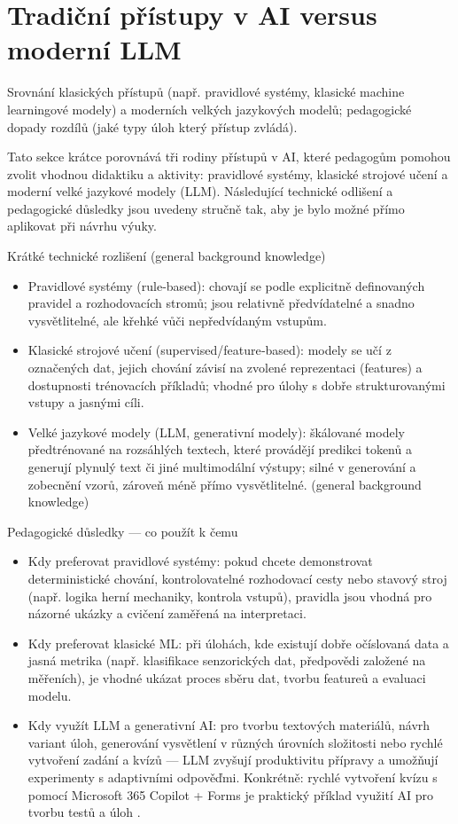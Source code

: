 \documentclass{report}%
\begin{document}
%
\section{Tradiční přístupy v AI versus moderní LLM}%
Srovnání klasických přístupů (např. pravidlové systémy, klasické machine learningové modely) a moderních velkých jazykových modelů; pedagogické dopady rozdílů (jaké typy úloh který přístup zvládá).%


%
Tato sekce krátce porovnává tři rodiny přístupů v AI, které pedagogům pomohou zvolit vhodnou didaktiku a aktivity: pravidlové systémy, klasické strojové učení a moderní velké jazykové modely (LLM). Následující technické odlišení a pedagogické důsledky jsou uvedeny stručně tak, aby je bylo možné přímo aplikovat při návrhu výuky.

Krátké technické rozlišení (general background knowledge)
\begin{itemize}
  \item Pravidlové systémy (rule‑based): chovají se podle explicitně definovaných pravidel a rozhodovacích stromů; jsou relativně předvídatelné a snadno vysvětlitelné, ale křehké vůči nepředvídaným vstupům.
  \item Klasické strojové učení (supervised/feature‑based): modely se učí z označených dat, jejich chování závisí na zvolené reprezentaci (features) a dostupnosti trénovacích příkladů; vhodné pro úlohy s dobře strukturovanými vstupy a jasnými cíli.
  \item Velké jazykové modely (LLM, generativní modely): škálované modely předtrénované na rozsáhlých textech, které provádějí predikci tokenů a generují plynulý text či jiné multimodální výstupy; silné v generování a zobecnění vzorů, zároveň méně přímo vysvětlitelné. (general background knowledge)
\end{itemize}

Pedagogické důsledky — co použít k čemu
\begin{itemize}
  \item Kdy preferovat pravidlové systémy: pokud chcete demonstrovat deterministické chování, kontrolovatelné rozhodovací cesty nebo stavový stroj (např. logika herní mechaniky, kontrola vstupů), pravidla jsou vhodná pro názorné ukázky a cvičení zaměřená na interpretaci.
  \item Kdy preferovat klasické ML: při úlohách, kde existují dobře očíslovaná data a jasná metrika (např. klasifikace senzorických dat, předpovědi založené na měřeních), je vhodné ukázat proces sběru dat, tvorbu featureů a evaluaci modelu.
  \item Kdy využít LLM a generativní AI: pro tvorbu textových materiálů, návrh variant úloh, generování vysvětlení v různých úrovních složitosti nebo rychlé vytvoření zadání a kvízů — LLM zvyšují produktivitu přípravy a umožňují experimenty s adaptivními odpověďmi. Konkrétně: rychlé vytvoření kvízu s pomocí Microsoft 365 Copilot + Forms je praktický příklad využití AI pro tvorbu testů a úloh \cite{kb_ai_101_tipu_pdf_04e4a115_page_8_1}.
\end{itemize}
\end{document}
